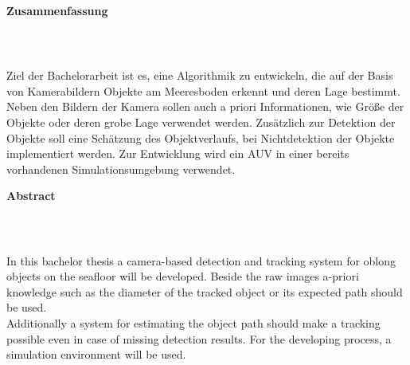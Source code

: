 \begin{verbatim}

\end{verbatim}
\begin{LARGE}\textbf{Zusammenfassung}\end{LARGE}\\
\begin{verbatim}

\end{verbatim}
Ziel der Bachelorarbeit ist es, eine Algorithmik zu entwickeln, die auf der Basis von Kamerabildern
Objekte am Meeresboden erkennt und deren Lage bestimmt. Neben den Bildern der Kamera sollen
auch a priori Informationen, wie Größe der Objekte oder deren grobe Lage verwendet werden.
Zusätzlich zur Detektion der Objekte soll eine Schätzung des Objektverlaufs, bei Nichtdetektion der
Objekte implementiert werden.
Zur Entwicklung wird ein AUV in einer bereits vorhandenen Simulationsumgebung verwendet.

\vfill

\begin{LARGE}\textbf{Abstract}\end{LARGE}\\
\begin{verbatim}

\end{verbatim}
In this bachelor thesis a camera-based detection and tracking system for oblong objects on the seafloor will be developed. Beside the raw images a-priori knowledge such as the diameter of the tracked object or its expected path should be used.\\
Additionally a system for estimating the object path should make a tracking possible even in case of missing detection results.
For the developing process, a simulation environment will be used.
\vfill